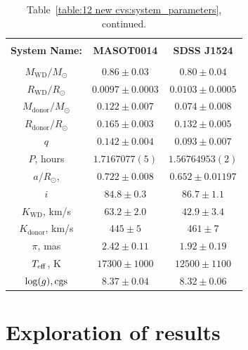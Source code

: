 \begin{landscape}
    \begin{table}
        \centering
        \caption{Table~\ref{table:12 new cvs:system_parameters}, continued.}
        \label{table:12 new cvs:system_parameters cont 2}
        \begin{tabular}{ccc}
            \hline \\
            \textbf{System Name:}      & \textbf{MASOT0014}     & \textbf{SDSS J1524} \\
            \hline \hline \\
            $M_\mathrm{WD}/M_\odot$    & $0.86\pm0.03$          & $0.80\pm0.04$ \\
            $R_\mathrm{WD}/R_\odot$    & $0.0097\pm0.0003$      & $0.0103\pm0.0005$ \\
            $M_\mathrm{donor}/M_\odot$ & $0.122\pm0.007$        & $0.074\pm0.008$ \\
            $R_\mathrm{donor}/R_\odot$ & $0.165\pm0.003$        & $0.132\pm0.005$ \\
            $q$                        & $0.142\pm0.004$        & $0.093\pm0.007$ \\
            \hline
            $P$, hours                 & $1.7167077(5)$         & $1.56764953(2)$ \\
            $a/R_\odot$,               & $0.722\pm0.008$        & $0.652\pm0.01197$ \\
            $i$                        & $84.8\pm0.3$           & $86.7\pm1.1$ \\
            $K_\mathrm{WD}$, km/s      & $63.2\pm2.0$           & $42.9\pm3.4$ \\
            $K_\mathrm{donor}$, km/s   & $445\pm5$              & $461\pm7$ \\
            \hline
            $\pi$, mas                 & $2.42\pm0.11$          & $1.92\pm0.19$ \\
            $T_{\rm eff}$, K           & $17300\pm1000$         & $12500\pm1100$ \\
            $\log(g), {\rm cgs}$       & $8.37\pm0.04$          & $8.32\pm0.06$ \\
            \hline
            \hline
        \end{tabular}
    \end{table}
\end{landscape}



\section{Exploration of results}
\label{sect:discussion:eclipse modelling of 12 CVs}

